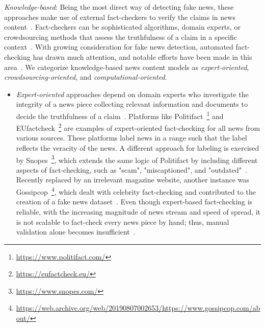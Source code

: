 \begin{description}
    \item{\emph{Knowledge-based}}: Being the most direct way of detecting fake news, these approaches make use of external fact-checkers to verify the claims in news content~\parencite{FakeNewsDetectionOnSocialMediaADataMiningPerspective_Shu}. Fact-checkers can be sophisticated algorithms, domain experts, or crowdsourcing methods that assess the truthfulness of a claim in a specific context~\parencite{FactChecking_Vlachos}. With growing consideration for fake news detection, automated fact-checking has drawn much attention, and notable efforts have been made in this area~\parencite{AutomatedFactChecking_Thorne, OverviewOfCheckThat_Barroncede}. We categorize knowledge-based news content models as \emph{expert-oriented}, \emph{crowdsourcing-oriented}, and \emph{computational-oriented}.
    \begin{itemize}
        \item \emph{Expert-oriented} approaches depend on domain experts who investigate the integrity of a news piece collecting relevant information and documents to decide the truthfulness of a claim~\parencite{ThePrincipleOfTruthOMeter_Holan}. Platforms like Politifact~\footnote{\url{https://www.politifact.com/}} and EUfactcheck~\footnote{\url{https://eufactcheck.eu/}} are examples of expert-oriented fact-checking for all news from various sources. These platforms label news in a range such that the label reflects the veracity of the news. A different approach for labeling is exercised by Snopes~\footnote{\url{https://www.snopes.com/}}, which extends the same logic of Politifact by including different aspects of fact-checking, such as "scam", "miscaptioned", and "outdated"~\parencite{FactCheckRatings_Snopes}. Recently replaced by an irrelevant magazine website, another instance was Gossipcop~\footnote{\url{https://web.archive.org/web/20190807002653/https://www.gossipcop.com/about/}}, which dealt with celebrity fact-checking and contributed to the creation of a fake news dataset~\parencite{FakeNewsNet_Shu}. Even though expert-based fact-checking is reliable, with the increasing magnitude of news stream and speed of spread, it is not scalable to fact-check every news piece by hand; thus, manual validation alone becomes insufficient~\parencite{ASurveyOnAutomatedFactChecking_Guo}.

\end{itemize}
\end{description}

